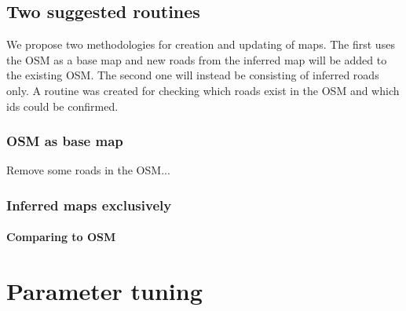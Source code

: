\subsection{Two suggested routines}

We propose two methodologies for creation and updating of maps. The first uses the \ac{OSM} as a base map and new roads from the inferred map will be added to the existing \ac{OSM}. The second one will instead be consisting of inferred roads only. A routine was created for checking which roads exist in the \ac{OSM} and which ids could be confirmed.

\subsubsection{OSM as base map}

Remove some roads in the OSM...

\subsubsection{Inferred maps exclusively}


\paragraph{Comparing to OSM}


\section{Parameter tuning}
\label{ch:experiments.sec:paramtuning}

